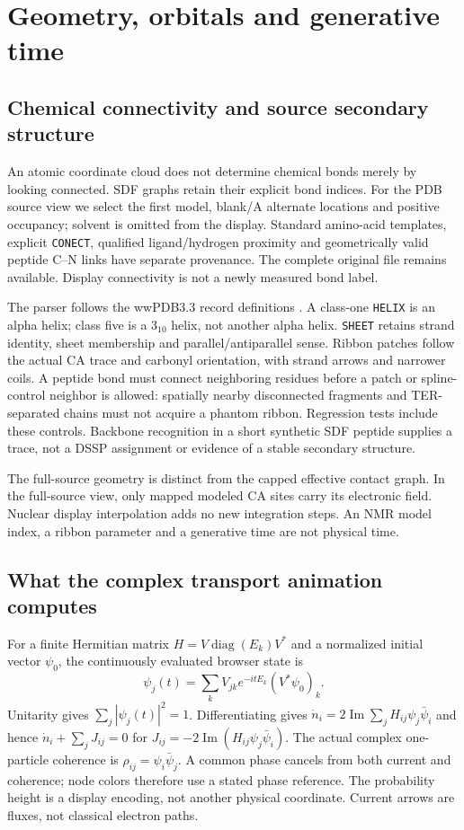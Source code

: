 \section{Geometry, orbitals and generative time}
\subsection{Chemical connectivity and source secondary structure}
An atomic coordinate cloud does not determine chemical bonds merely by
looking connected. SDF graphs retain their explicit bond indices. For the PDB
source view we select the first model, blank/A alternate locations and positive
occupancy; solvent is omitted from the display. Standard amino-acid templates,
explicit \texttt{CONECT}, qualified ligand/hydrogen proximity and geometrically
valid peptide C--N links have separate provenance. The complete original file
remains available. Display connectivity is not a newly measured bond label.

The parser follows the wwPDB3.3 record definitions \cite{VisPDB}. A class-one
\texttt{HELIX} is an alpha helix; class five is a $3_{10}$ helix, not another
alpha helix. \texttt{SHEET} retains strand identity, sheet membership and
parallel/antiparallel sense. Ribbon patches follow the actual CA trace and
carbonyl orientation, with strand arrows and narrower coils. A peptide bond
must connect neighboring residues before a patch or spline-control neighbor
is allowed: spatially nearby disconnected fragments and TER-separated chains
must not acquire a phantom ribbon. Regression tests include these controls.
Backbone recognition in a short synthetic SDF peptide supplies a trace, not a
DSSP assignment or evidence of a stable secondary structure.

The full-source geometry is distinct from the capped effective contact graph.
In the full-source view, only mapped modeled CA sites carry its electronic
field. Nuclear display interpolation adds no new integration steps. An NMR
model index, a ribbon parameter and a generative time are not physical time.

\subsection{What the complex transport animation computes}
For a finite Hermitian matrix $H=V\operatorname{diag}(E_k)V^*$ and a normalized
initial vector $\psi_0$, the continuously evaluated browser state is
\[
 \psi_j(t)=\sum_k V_{jk}e^{-itE_k}(V^*\psi_0)_k.
\]
Unitarity gives $\sum_j|\psi_j(t)|^2=1$. Differentiating gives
$\dot n_i=2\operatorname{Im}\sum_jH_{ij}\psi_j\bar\psi_i$ and hence
$\dot n_i+\sum_jJ_{ij}=0$ for
$J_{ij}=-2\operatorname{Im}(H_{ij}\psi_j\bar\psi_i)$.
The actual complex one-particle coherence is
$\rho_{ij}=\psi_i\bar\psi_j$. A common phase cancels from both current and
coherence; node colors therefore use a stated phase reference. The probability
height is a display encoding, not another physical coordinate. Current arrows
are fluxes, not classical electron paths.

